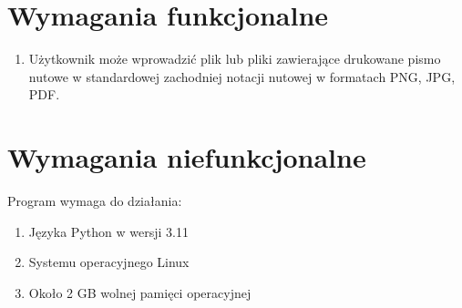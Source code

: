 \section{Wymagania funkcjonalne}
	\begin{enumerate}
		\item Użytkownik może wprowadzić plik lub pliki zawierające drukowane pismo nutowe w standardowej zachodniej notacji nutowej w formatach PNG, JPG, PDF.
	\end{enumerate}
	
	
\section{Wymagania niefunkcjonalne}
Program wymaga do działania:
	\begin{enumerate}
		\item Języka Python w wersji 3.11
		\item Systemu operacyjnego Linux
		\item Około 2 GB wolnej pamięci operacyjnej
	\end{enumerate}